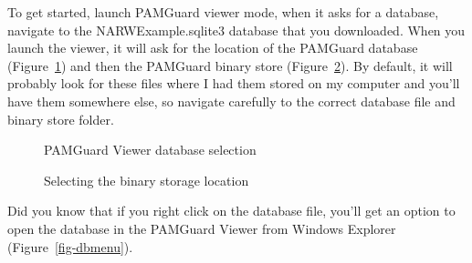 \documentclass[
]{article}
\begin{document}
To get started, launch PAMGuard viewer mode, when it asks for a
database, navigate to the NARWExample.sqlite3 database that you
downloaded. When you launch the viewer, it will ask for the location of
the PAMGuard database (Figure~\ref{fig-launch}) and then the PAMGuard
binary store (Figure~\ref{fig-binaryselect}). By default, it will
probably look for these files where I had them stored on my computer and
you'll have them somewhere else, so navigate carefully to the correct
database file and binary store folder.

\begin{figure}


\caption{\label{fig-launch}PAMGuard Viewer database selection}

\end{figure}%

\begin{figure}


\caption{\label{fig-binaryselect}Selecting the binary storage location}

\end{figure}%

\begin{tcolorbox}[enhanced jigsaw, rightrule=.15mm, bottomtitle=1mm, left=2mm, breakable, opacitybacktitle=0.6, opacityback=0, bottomrule=.15mm, toprule=.15mm, colframe=quarto-callout-tip-color-frame, toptitle=1mm, colback=white, titlerule=0mm, title=\textcolor{quarto-callout-tip-color}{\faLightbulb}\hspace{0.5em}{Windows Explorer quick access}, coltitle=black, arc=.35mm, leftrule=.75mm, colbacktitle=quarto-callout-tip-color!10!white]

Did you know that if you right click on the database file, you'll get an
option to open the database in the PAMGuard Viewer from Windows Explorer
(Figure~\ref{fig-dbmenu}).

\end{tcolorbox}
\end{document}
